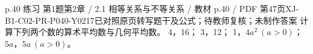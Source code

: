 \par\noindent\begin{minipage}{\linewidth}
\begin{bankitem}{p.40 练习 第1题}{第2章 / 2.1 相等关系与不等关系 / 教材 p.40 / PDF 第47页}{XJ-B1-C02-PR-P040-Y0217}{已对照原页转写题干及公式；待教师复核；未制作答案}
计算下列两个数的算术平均数与几何平均数。
4，16；
3，12；
1，$4a^2\ (a>0)$；
$5a$，$5a\ (a>0)$。
\end{bankitem}
\end{minipage}\par\medskip
